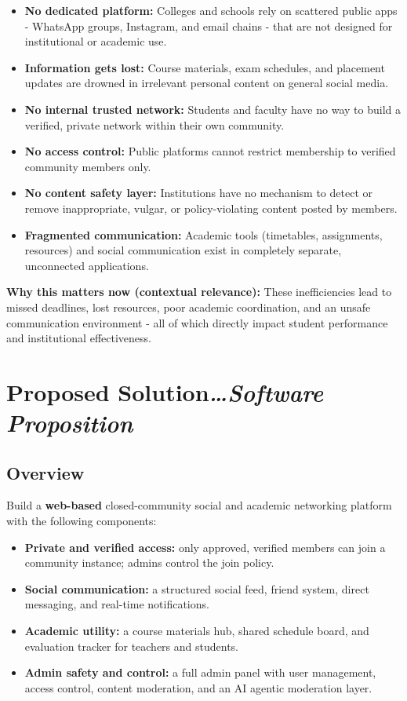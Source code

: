 \documentclass[11pt,a4paper]{article}
\newcommand{\BvrHint}[1]{{\normalfont\normalsize\itshape\hfill #1}}
\begin{document}
\begin{itemize}[leftmargin=0.7cm]
    \item \textbf{No dedicated platform:} Colleges and schools rely on scattered public apps - WhatsApp groups, Instagram, and email chains - that are not designed for institutional or academic use.
    \item \textbf{Information gets lost:} Course materials, exam schedules, and placement updates are drowned in irrelevant personal content on general social media.
    \item \textbf{No internal trusted network:} Students and faculty have no way to build a verified, private network within their own community.
    \item \textbf{No access control:} Public platforms cannot restrict membership to verified community members only.
    \item \textbf{No content safety layer:} Institutions have no mechanism to detect or remove inappropriate, vulgar, or policy-violating content posted by members.
    \item \textbf{Fragmented communication:} Academic tools (timetables, assignments, resources) and social communication exist in completely separate, unconnected applications.
\end{itemize}

\textbf{Why this matters now (contextual relevance):} These inefficiencies lead to missed deadlines, lost resources, poor academic coordination, and an unsafe communication environment - all of which directly impact student performance and institutional effectiveness.

\section{Proposed Solution\BvrHint{\ldots Software Proposition}}

\subsection{Overview}

Build a \textbf{web-based} closed-community social and academic networking platform with the following components:
\begin{itemize}[leftmargin=0.7cm]
    \item \textbf{Private and verified access:} only approved, verified members can join a community instance; admins control the join policy.
    \item \textbf{Social communication:} a structured social feed, friend system, direct messaging, and real-time notifications.
    \item \textbf{Academic utility:} a course materials hub, shared schedule board, and evaluation tracker for teachers and students.
    \item \textbf{Admin safety and control:} a full admin panel with user management, access control, content moderation, and an AI agentic moderation layer.
\end{itemize}
\end{document}
